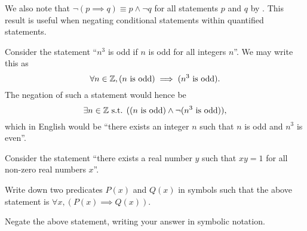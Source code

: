 We also note that $\lnot(p \implies q) \equiv p \land \lnot q$ for all statements $p$ and $q$ by . This result is useful when negating conditional statements within quantified statements.

\begin{example}
    Consider the statement ``$n^3$ is odd if $n$ is odd for all integers $n$''. We may write this as
    \[
        \forall n \in \mathbb{Z}, (n \text{ is odd}) \implies (n^3 \text{ is odd}).
    \]
    The negation of such a statement would hence be
    \[
        \exists n \in \mathbb{Z} \text{ s.t. }((n \text{ is odd}) \land \lnot(n^3 \text{ is odd})),
    \]
    which in English would be ``there exists an integer $n$ such that $n$ is odd and $n^3$ is even''.
\end{example}

\begin{exercise}
    Consider the statement ``there exists a real number $y$ such that $xy = 1$ for all non-zero real numbers $x$''.
    \begin{partquestions}{\roman*}
        \item Write down two predicates $P(x)$ and $Q(x)$ in symbols such that the above statement is $\forall x,(P(x) \implies Q(x))$.
        \item Negate the above statement, writing your answer in symbolic notation.
    \end{partquestions}
\end{exercise}

